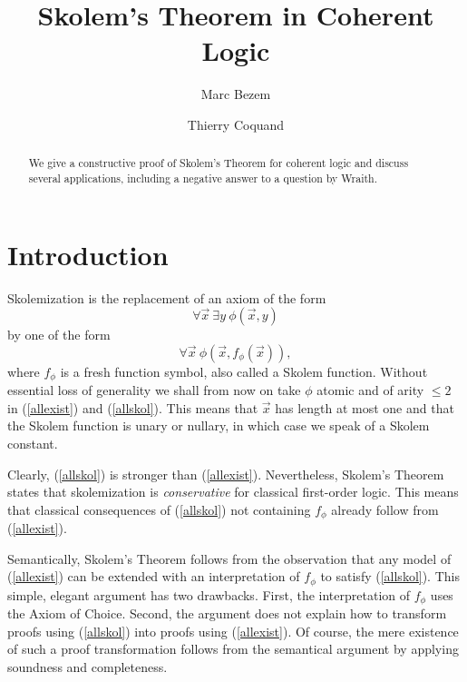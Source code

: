 \documentclass[10pt,a4paper]{article}
\begin{document}
\title{Skolem's Theorem in Coherent Logic}

\author[1]{Marc Bezem}

\author[2]{Thierry Coquand}

\date{}
\maketitle

\begin{abstract}
We give a constructive proof of Skolem's Theorem for coherent logic
and discuss several applications, including a negative answer to 
a question by Wraith.
\end{abstract}


\section*{Introduction}
Skolemization is the replacement of an axiom of the form
\begin{equation}\label{allexist}
\forall\vec{x}~\exists y~\phi(\vec{x},y)
\end{equation}
by one of the form
\begin{equation}\label{allskol}
\forall\vec{x}~\phi(\vec{x},f_\phi(\vec{x})),
\end{equation}
where $f_\phi$ is a fresh function symbol, also called a Skolem function.
Without essential loss of generality we shall from now on take $\phi$ atomic
and of arity $\leq 2$ in (\ref{allexist}) and (\ref{allskol}). This means
that $\vec{x}$ has length at most one and that the Skolem function is
unary or nullary, in which case we speak of a Skolem constant.

Clearly, (\ref{allskol}) is stronger than (\ref{allexist}).
Nevertheless, Skolem's Theorem states that skolemization is \emph{conservative}
for classical first-order logic. This means that classical consequences of
(\ref{allskol}) not containing $f_\phi$ already follow from (\ref{allexist}).

Semantically, Skolem's Theorem follows from the observation that
any model of (\ref{allexist}) can be extended with an interpretation
of $f_\phi$ to satisfy (\ref{allskol}). This simple, elegant argument has two
drawbacks. First, the interpretation of $f_\phi$ uses the Axiom of Choice.
Second, the argument does not explain how to transform proofs using
(\ref{allskol}) into proofs using (\ref{allexist}).
Of course, the mere existence of such a proof transformation
follows from the semantical argument by applying soundness and completeness.
\end{document}
